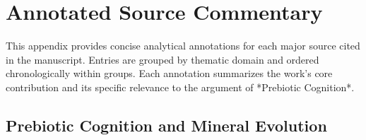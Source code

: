 \documentclass[11pt,a4paper]{article}
\begin{document}
\section{Annotated Source Commentary}
\label{app:annotated}

This appendix provides concise analytical annotations for each major source cited in the manuscript.  Entries are grouped by thematic domain and ordered chronologically within groups.  Each annotation summarizes the work’s core contribution and its specific relevance to the argument of *Prebiotic Cognition*.

\subsection*{Prebiotic Cognition and Mineral Evolution}
\end{document}
